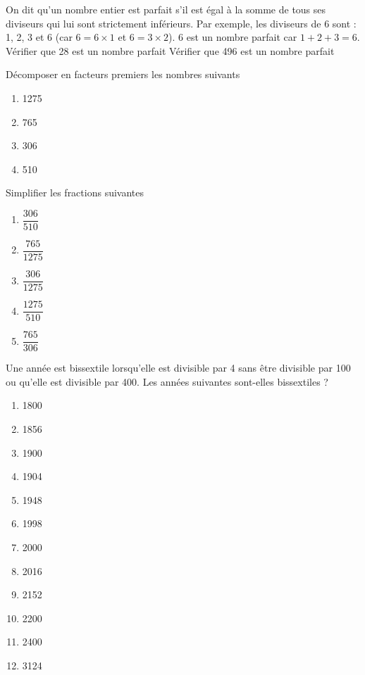 \documentclass[../Cours.tex]{subfiles}
\begin{document}
\begin{questions}
    \exercice On dit qu'un nombre entier est parfait s'il est égal à la somme de tous ses diviseurs qui lui sont strictement inférieurs. Par exemple, les diviseurs de 6 sont : 1, 2, 3 et 6 (car $6 = 6 \times 1$ et $6 = 3 \times 2$). 6 est un nombre parfait car $1+2+3 = 6$.
        \question Vérifier que 28 est un nombre parfait
        \question Vérifier que 496 est un nombre parfait
        
        
    \exercice
        \question Décomposer en facteurs premiers les nombres suivants
        \vspace{-1ex}
        \begin{multicols}{4}
        \begin{enumerate}[label={\alph*)}]
            \item 1275
            \item 765
            \item 306
            \item 510
        \end{enumerate}
        \end{multicols}
        \question Simplifier les fractions suivantes
        \begin{multicols}{5}
        \begin{enumerate}[label={\alph*)}]
            \item $\dfrac{306}{510}$
            \item $\dfrac{765}{1275}$
            \item $\dfrac{306}{1275}$
            \item $\dfrac{1275}{510}$
            \item $\dfrac{765}{306}$
        \end{enumerate}
        \end{multicols}

    \exercice Une année est bissextile lorsqu'elle est divisible par 4 sans être divisible par 100 ou qu'elle est divisible par 400. Les années suivantes sont-elles bissextiles ?
    \begin{multicols}{6}
    \begin{enumerate}[label={\alph*)}]
        \item 1800
        \item 1856
        \item 1900
        \item 1904
        \item 1948
        \item 1998
        \item 2000
        \item 2016
        \item 2152
        \item 2200
        \item 2400
        \item 3124
    \end{enumerate}
    \end{multicols}

\end{questions}
\end{document}
